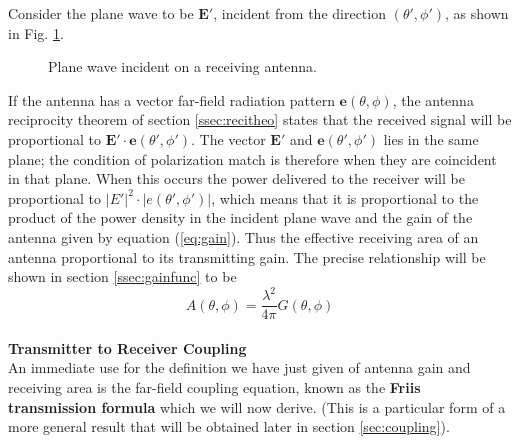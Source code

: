 Consider the plane wave to be $\mathbf{E}'$, incident from the direction $(\theta', \phi')$, as shown in Fig. \ref{fig:receive}. 
\begin{figure}[htbp]
	\begin{center}
	\end{center}
	\caption{Plane wave incident on a receiving antenna.} 
	\label{fig:receive}
\end{figure}
If the antenna has a vector far-field radiation pattern $\mathbf{e}(\theta,\phi)$, the antenna reciprocity theorem of section \ref{ssec:recitheo} states that the received signal will be proportional to $\mathbf{E}'\cdot\mathbf{e}(\theta',\phi')$. The vector $\mathbf{E}'$ and $\mathbf{e}(\theta',\phi')$ lies in the same plane; the condition of polarization match is therefore when they are coincident in that plane. When this occurs the power delivered to the receiver will be proportional to $|E'|^2\cdot|e(\theta',\phi')|$, which means that it is proportional to the product of the power density in the incident plane wave and the gain of the antenna given by equation (\ref{eq:gain}). Thus the effective receiving area of an antenna proportional to its transmitting gain. The precise relationship will be shown in section \ref{ssec:gainfunc} to be
\begin{equation}
A(\theta,\phi)=\dfrac{\lambda^2}{4\pi}G(\theta,\phi)
\label{eq:Atp}
\end{equation}
\\
\textbf{Transmitter to Receiver Coupling}\\
An immediate use for the definition we have just given of antenna gain and receiving area is the far-field coupling equation, known as the \textbf{Friis transmission formula} which we will now derive. (This is a particular form of a more general result that will be obtained later in section \ref{sec:coupling}).

